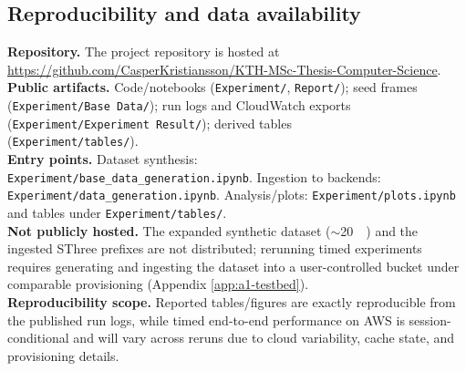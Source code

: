 \documentclass[nomenclature, english, bibtex]{kththesis}
\numberwithin{listing}{chapter}
\begin{document}
\subsection{Reproducibility and data availability}
\label{app:a5b-availability}
\textbf{Repository.} The project repository is hosted at \url{https://github.com/CasperKristiansson/KTH-MSc-Thesis-Computer-Science}.\\
\textbf{Public artifacts.} Code/notebooks (\texttt{Experiment/}, \texttt{Report/}); seed frames (\texttt{Experiment/Base Data/}); run logs and CloudWatch exports (\texttt{Experiment/Experiment Result/}); derived tables \\(\texttt{Experiment/tables/}).\\
\textbf{Entry points.} Dataset synthesis: \\ \texttt{Experiment/base\_data\_generation.ipynb}. Ingestion to backends: \texttt{Experiment/data\_generation.ipynb}. Analysis/plots: \texttt{Experiment/plots.ipynb} and tables under \texttt{Experiment/tables/}.\\
\textbf{Not publicly hosted.} The expanded synthetic dataset (\(\sim\)\SI{20}{\gibi\byte}) and the ingested \gls{SThree} prefixes are not distributed; rerunning timed experiments requires generating and ingesting the dataset into a user-controlled bucket under comparable provisioning (Appendix \ref{app:a1-testbed}).\\
\textbf{Reproducibility scope.} Reported tables/figures are exactly reproducible from the published run logs, while timed end-to-end performance on \gls{AWS} is session-conditional and will vary across reruns due to cloud variability, cache state, and provisioning details.
\end{document}
